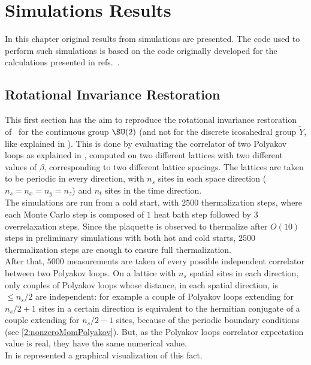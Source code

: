 \pagestyle{myFancy}
\chapter{Simulations Results}
In this chapter original results from simulations are presented.
The code used to perform such simulations is based on the code originally developed for the calculations presented in refs.~\cite{Panero:2009tv,Mykkanen:2012ri}.

\section{Rotational Invariance Restoration}
This first section has the aim to reproduce the rotational invariance restoration of~\cite{Lang:1982tj} for the continuous group $\SU(2)$ (and not for the discrete icosahedral group $\tilde{Y}$, like explained in ).
This is done by evaluating the correlator of two Polyakov loops as explained in , computed on two different lattices with two different values of $\beta$, corresponding to two different lattice spacings.
The lattices are taken to be periodic in every direction, with $n_s$ sites in each space direction ($n_s=n_x=n_y=n_z$) and $n_t$ sites in the time direction.\\
The simulations are run from a cold start, with $2500$ thermalization steps, where each Monte Carlo step is composed of $1$ heat bath step followed by $3$ overrelaxation steps.
Since the plaquette is observed to thermalize after $O(10)$ steps in preliminary simulations with both hot and cold starts, $2500$ thermalization steps are enough to ensure full thermalization.\\
After that, $5000$ measurements are taken of every possible independent correlator between two Polyakov loops.
On a lattice with $n_s$ spatial sites in each direction, only couples of Polyakov loops whose distance, in each spatial direction, is $\leq n_s/2$ are independent: for example a couple of Polyakov loops extending for $n_s/2+1$ sites in a certain direction is equivalent to the hermitian conjugate of a couple extending for $n_s/2-1$ sites, because of the periodic boundary conditions (see \eqref{2:nonzeroMomPolyakov}).
But, as the Polyakov loops correlator expectation value is real, they have the same numerical value.\\
In  is represented a graphical visualization of this fact.
